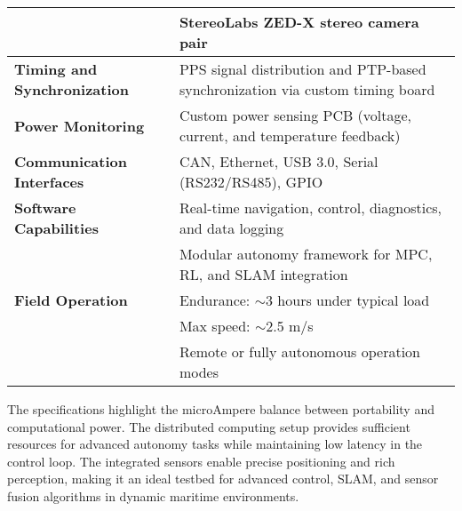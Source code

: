 \begin{table}[H]
\begin{tabular}{|p{4cm}|p{9cm}|}
        & StereoLabs ZED-X stereo camera pair \\ \hline
        \textbf{Timing and Synchronization} & PPS signal distribution and PTP-based synchronization via custom timing board \\ \hline
        \textbf{Power Monitoring} & Custom power sensing PCB (voltage, current, and temperature feedback) \\ \hline
        \textbf{Communication Interfaces} & CAN, Ethernet, USB 3.0, Serial (RS232/RS485), GPIO \\ \hline
        \textbf{Software Capabilities} & Real-time navigation, control, diagnostics, and data logging \\ 
        & Modular autonomy framework for MPC, RL, and SLAM integration \\ \hline
        \textbf{Field Operation} & Endurance: $\sim$3 hours under typical load \\ 
        & Max speed: $\sim$2.5 m/s \\ 
        & Remote or fully autonomous operation modes \\ \hline
    \end{tabular}
\end{table}
\noindent
The specifications highlight the microAmpere balance between portability and computational power. The distributed computing setup provides sufficient resources for advanced autonomy tasks while maintaining low latency in the control loop. The integrated sensors enable precise positioning and rich perception, making it an ideal testbed for advanced control, SLAM, and sensor fusion algorithms in dynamic maritime environments.

